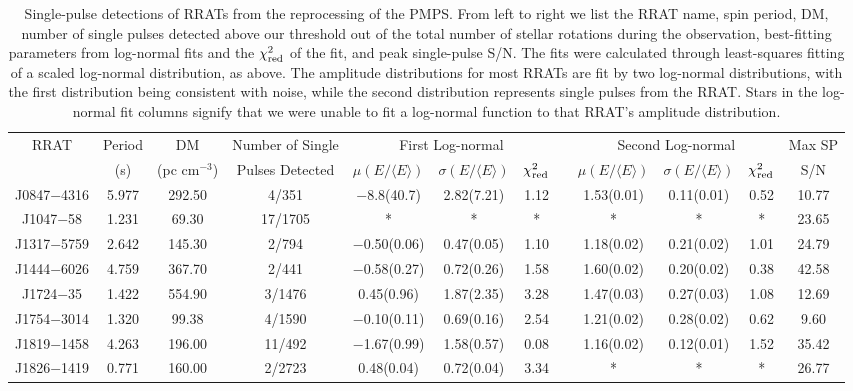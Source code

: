 \documentclass[fleqn,usenatbib]{mnras}
\begin{document}
\begin{table*}
\centering
\small
\rotate
\caption[Single-pulse Detections of RRATs]{Single-pulse detections of RRATs from the reprocessing 
of the PMPS. From left to right we list the RRAT name, spin period, DM, number of single pulses 
detected above our threshold out of the total number of stellar rotations during the observation, best-fitting
parameters from log-normal fits and the $\chi_{\rm red}^2$ of the fit, and peak single-pulse S/N. The
fits were calculated through least-squares fitting of a scaled log-normal distribution, as above. 
The amplitude distributions for most RRATs are fit by two log-normal distributions, with the first 
distribution being consistent with noise, while the second distribution represents single pulses 
from the RRAT. Stars in the log-normal fit columns signify that we were unable to fit a log-normal 
function to that RRAT's amplitude distribution.}
\begin{tabular}{cccccccccccc}
\hline
\hline
RRAT & Period & DM & Number of Single & \multicolumn{3}{c}{First Log-normal} & & \multicolumn{3}{c}{Second Log-normal} & Max SP\\
\cline{5-7} \cline{9-11}
 & (s) & (pc cm$^{-3}$) & Pulses Detected & $\mu (E/\langle{E}\rangle)$ & $\sigma (E/\langle{E}\rangle)$ & $\chi_{\rm red}^2$ & & $\mu (E/\langle{E}\rangle)$ & $\sigma (E/\langle{E}\rangle)$ & $\chi_{\rm red}^2$ & S/N\\
\hline
J0847$-$4316 & 5.977 & 292.50 & 4/351 & $-$8.8(40.7) & 2.82(7.21) & 1.12 & & 1.53(0.01) & 0.11(0.01) & 0.52 & 10.77\\
J1047$-$58 & 1.231 & 69.30 & 17/1705 & * & * & * & & * & * & * & 23.65\\
J1317$-$5759 & 2.642 & 145.30 & 2/794 & $-$0.50(0.06) & 0.47(0.05) & 1.10 & & 1.18(0.02) & 0.21(0.02) & 1.01 & 24.79\\
J1444$-$6026 & 4.759 & 367.70 & 2/441 & $-$0.58(0.27) & 0.72(0.26) & 1.58 & & 1.60(0.02) & 0.20(0.02) & 0.38 & 42.58\\
J1724$-$35 & 1.422 & 554.90 & 3/1476 & 0.45(0.96) & 1.87(2.35) & 3.28 & & 1.47(0.03) & 0.27(0.03) & 1.08 & 12.69\\
J1754$-$3014 & 1.320 & 99.38 & 4/1590 & $-$0.10(0.11) & 0.69(0.16) & 2.54 & & 1.21(0.02) & 0.28(0.02) & 0.62 & 9.60\\
J1819$-$1458 & 4.263 & 196.00 & 11/492 & $-$1.67(0.99) & 1.58(0.57) & 0.08 & & 1.16(0.02) & 0.12(0.01) & 1.52 & 35.42\\
J1826$-$1419 & 0.771 & 160.00 & 2/2723 & 0.48(0.04) & 0.72(0.04) & 3.34 & & * & * & * & 26.77\\

\end{tabular}
\end{table*}
\end{document}
